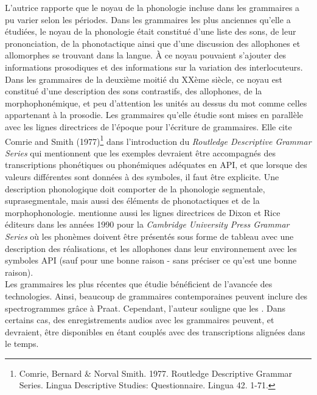 L'autrice rapporte que le noyau de la phonologie incluse dans les grammaires a pu varier selon les périodes.
Dans les grammaires les plus anciennes qu'elle a étudiées, le noyau de la phonologie était constitué d'une liste des sons, de leur prononciation, de la phonotactique ainsi que d'une discussion des allophones et allomorphes se trouvant dans la langue. À ce noyau pouvaient s'ajouter des informations prosodiques et des informations sur la variation des interlocuteurs. Dans les grammaires de la deuxième moitié du XXème siècle, ce noyau est constitué d'une description des sons contrastifs, des allophones, de la morphophonémique, et peu d'attention les unités au dessus du mot comme celles appartenant à la prosodie.
Les grammaires qu'elle étudie sont mises en parallèle avec les lignes directrices de l'époque pour l'écriture de grammaires. Elle cite Comrie and Smith (1977)\footnote{Comrie, Bernard \& Norval Smith. 1977. Routledge Descriptive Grammar Series. Lingua Descriptive Studies: Questionnaire. Lingua 42. 1-71.} dans l'introduction du \textit{Routledge Descriptive Grammar Series} qui mentionnent que les exemples devraient être accompagnés des transcriptions phonétiques ou phonémiques adéquates en API, et que lorsque des valeurs différentes sont données à des symboles, il faut être explicite. Une description phonologique doit comporter de la phonologie segmentale, suprasegmentale, mais aussi des éléments de phonotactiques et de la morphophonologie. \citeauthor{riceSoundsGrammarWriting2014} mentionne aussi les lignes directrices de Dixon et Rice éditeurs dans les années 1990 pour la \textit{Cambridge University Press Grammar Series} où les phonèmes doivent être présentés sous forme de tableau avec une description des réalisations, et les allophones dans leur environnement avec les symboles API (sauf pour une bonne raison - sans préciser ce qu'est une bonne raison).\\

Les grammaires les plus récentes que \citeauthor{riceSoundsGrammarWriting2014} étudie bénéficient de l'avancée des technologies. Ainsi, beaucoup de grammaires contemporaines peuvent inclure des spectrogrammes grâce à Praat. Cependant, l'auteur souligne que les  \parencite[80]{riceSoundsGrammarWriting2014}. Dans certains cas, des enregistrements audios avec les grammaires peuvent, et devraient, être disponibles en étant couplés avec des transcriptions alignées dans le temps.\\

